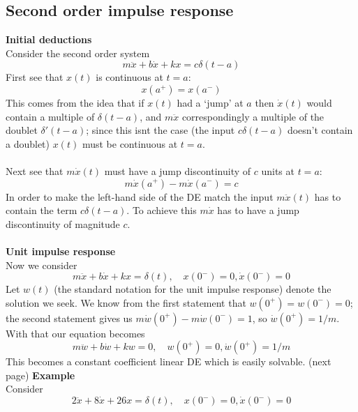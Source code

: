 \documentclass{report}
\begin{document}
\subsection{Second order impulse response}
\textbf{Initial deductions}\\
Consider the second order system
\begin{equation*}
m\ddot{x}+b\dot{x}+kx=c\delta(t-a)
\end{equation*}
First see that $x(t)$ is continuous at $t=a$:
\begin{equation*}
x(a^+)=x(a^-)
\end{equation*}
This comes from the idea that if $x(t)$ had a `jump' at $a$ then $\dot{x}(t)$ would contain a multiple of
$\delta(t-a)$, and $m\ddot{x}$ correspondingly a multiple of the doublet $\delta'(t-a)$; since this isnt the case
(the input $c\delta(t-a)$ doesn't contain a doublet)
$x(t)$ must be continuous at $t=a$.\\
\vspace{1mm}\\
Next see that $m\dot{x}(t)$ must have a jump discontinuity of $c$ units at $t=a$:
\begin{equation*}
m\dot{x}(a^+)-m\dot{x}(a^-)=c
\end{equation*}
In order to make the left-hand side of the DE match the input $m\ddot{x}(t)$ has to contain the term $c\delta(t-a)$.
To achieve this $m\dot{x}$ has to have a jump discontinuity of magnitude $c$.\\
\vspace{1mm}\\
\textbf{Unit impulse response}\\
Now we consider 
\begin{equation*}
m\ddot{x}+b\dot{x}+kx=\delta(t),\quad x(0^-)=0,\dot{x}(0^-)=0
\end{equation*}
Let $w(t)$ (the standard notation for the unit impulse response) denote the solution we seek. 
We know from the first statement that
$w(0^+)=w(0^-)=0$; the second statement gives us $m\dot{w}(0^+)-m\dot{w}(0^-)=1$, so $\dot{w}(0^+)=1/m$. With
that our equation becomes
\begin{equation*}
m\ddot{w}+b\dot{w}+kw=0,\quad w(0^+)=0,\dot{w}(0^+)=1/m
\end{equation*}
This becomes a constant coefficient linear DE which is easily solvable.
(next page)\newpage
\noindent\textbf{Example}\\
Consider 
\begin{equation*}
2\ddot{x}+8\dot{x}+26x=\delta(t),\quad x(0^-)=0,\dot{x}(0^-)=0
\end{equation*}
\end{document}
